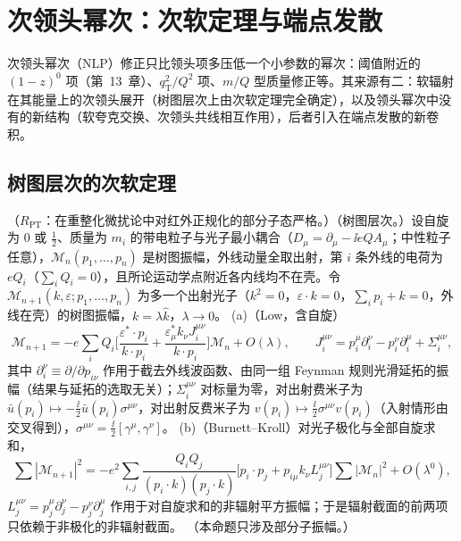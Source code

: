 \section{次领头幂次：次软定理与端点发散}\label{sec:power-nlp}

次领头幂次（NLP）修正只比领头项多压低一个小参数的幂次：阈值附近的 $(1-z)^0$ 项（第~13~章）、$q_{\mathrm T}^2/Q^2$ 项、$m/Q$ 型质量修正等。其来源有二：软辐射在其能量上的次领头展开（树图层次上由次软定理完全确定），以及领头幂次中没有的新结构（软夸克交换、次领头共线相互作用），后者引入在端点发散的新卷积。

\subsection{树图层次的次软定理}

\begin{proposition}\label{prop:power-next-to-soft}
（$R_{\mathrm{PT}}$：在重整化微扰论中对红外正规化的部分子态严格。）（树图层次。）设自旋为 0 或 $\frac12$、质量为 $m_i$ 的带电粒子与光子最小耦合（$D_\mu=\partial_\mu-\ii eQA_\mu$；中性粒子任意），$\mathcal M_n(p_1,\dots,p_n)$ 是树图振幅，外线动量全取出射，第 $i$ 条外线的电荷为 $eQ_i$（$\sum_iQ_i=0$），且所论运动学点附近各内线均不在壳。令 $\mathcal M_{n+1}(k,\varepsilon;p_1,\dots,p_n)$ 为多一个出射光子（$k^2=0$，$\varepsilon\cdot k=0$，$\sum_ip_i+k=0$，外线在壳）的树图振幅，$k=\lambda\hat k$，$\lambda\to0$。
(a)（Low，含自旋）
\begin{equation}\label{eq:power-lbk}
\mathcal M_{n+1}=-e\sum_iQ_i\Big[\frac{\varepsilon^*\!\cdot p_i}{k\cdot p_i}+\frac{\varepsilon^*_\mu k_\nu J_i^{\mu\nu}}{k\cdot p_i}\Big]\mathcal M_n+O(\lambda),\qquad
J_i^{\mu\nu}=p_i^\mu\partial_i^\nu-p_i^\nu\partial_i^\mu+\Sigma_i^{\mu\nu},
\end{equation}
其中 $\partial_i^\nu\equiv\partial/\partial p_{i\nu}$ 作用于截去外线波函数、由同一组 Feynman 规则光滑延拓的振幅（结果与延拓的选取无关）；$\Sigma_i^{\mu\nu}$ 对标量为零，对出射费米子为 $\bar u(p_i)\mapsto-\frac{\ii}{2}\bar u(p_i)\sigma^{\mu\nu}$，对出射反费米子为 $v(p_i)\mapsto\frac{\ii}{2}\sigma^{\mu\nu}v(p_i)$（入射情形由交叉得到），$\sigma^{\mu\nu}=\frac{\ii}{2}[\gamma^\mu,\gamma^\nu]$。
(b)（Burnett--Kroll）对光子极化与全部自旋求和，
\begin{equation}\label{eq:power-bk}
\sum|\mathcal M_{n+1}|^2=-e^2\sum_{i,j}\frac{Q_iQ_j}{(p_i\cdot k)(p_j\cdot k)}\Big[p_i\cdot p_j+p_{i\mu}k_\nu L_j^{\mu\nu}\Big]\sum|\mathcal M_n|^2+O(\lambda^0),
\end{equation}
$L_j^{\mu\nu}=p_j^\mu\partial_j^\nu-p_j^\nu\partial_j^\mu$ 作用于对自旋求和的非辐射平方振幅；于是辐射截面的前两项只依赖于非极化的非辐射截面。
（本命题只涉及部分子振幅。）
\end{proposition}

